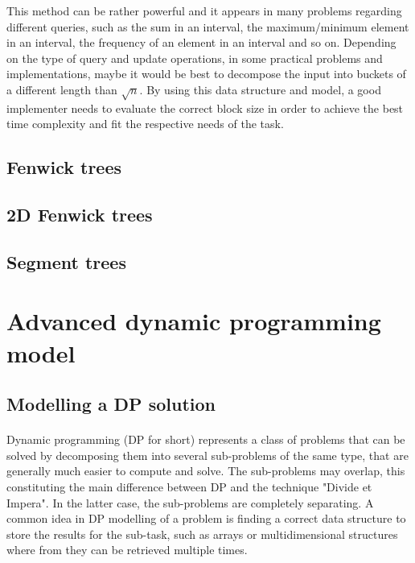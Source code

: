 \documentclass[letterpaper]{article}
\begin{document}
This method can be rather powerful and it appears in many problems regarding different queries, such as the sum in an interval, the maximum/minimum element in an interval, the frequency of an element in an interval and so on. Depending on the type of query and update operations, in some practical problems and implementations, maybe it would be best to decompose the input into buckets of a different length than $\sqrt{n}$. By using this data structure and model, a good implementer needs to evaluate the correct block size in order to achieve the best time complexity and fit the respective needs of the task.

\newpage

\subsection{Fenwick trees}

\newpage

\subsection{2D Fenwick trees}

\newpage

\subsection{Segment trees}

\newpage

\section{Advanced dynamic programming model}

\subsection{Modelling a DP solution}

\paragraph{}

Dynamic programming (DP for short) represents a class of problems that can be solved by decomposing them into several sub-problems of the same type, that are generally much easier to compute and solve. The sub-problems may overlap, this constituting the main difference between DP and the technique "Divide et Impera". In the latter case, the sub-problems are completely separating. A common idea in DP modelling of a problem is finding a correct data structure to store the results for the sub-task, such as arrays or multidimensional structures where from they can be retrieved multiple times.
\end{document}
